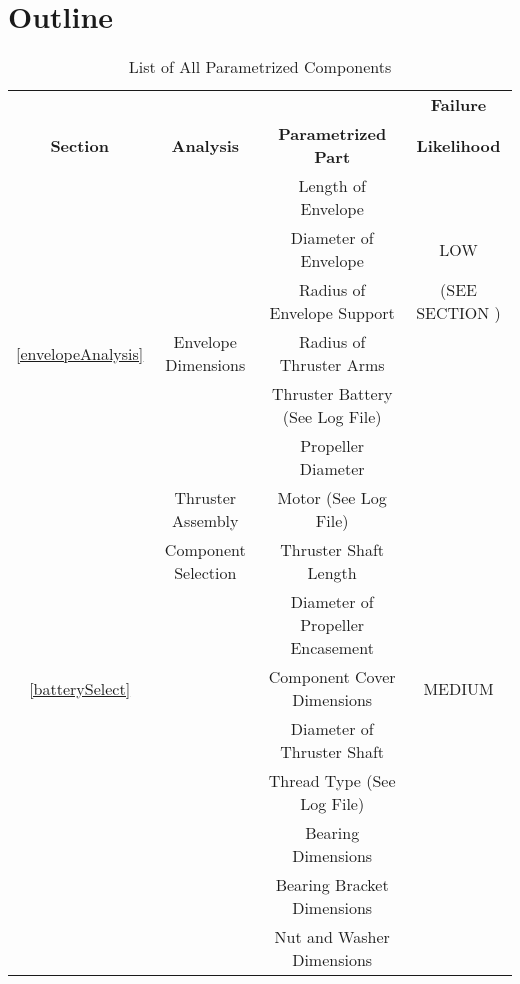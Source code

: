 \documentclass[../main.tex]{subfiles}
\begin{document}
\section{Outline}

\begin{table}[]
	\centering
	\caption{List of All Parametrized Components}
	\label{allComponents}
	\begin{tabular}{|c|c|c|c|}
		\hline
		&  &  & \textbf{Failure} \\
		\multirow{-2}{*}{\textbf{Section}} & \multirow{-2}{*}{\textbf{Analysis}} & \multirow{-2}{*}{\textbf{Parametrized Part}} & \textbf{Likelihood} \\ \hline
		&  & Length of Envelope &  \\ \cline{3-3}
		&  & Diameter of Envelope & LOW \\ \cline{3-3}
		&  & Radius of Envelope Support & (SEE SECTION ) \\ \cline{3-3}
		\multirow{-4}{*}{\ref{envelopeAnalysis}} & \multirow{-4}{*}{Envelope Dimensions} & Radius of Thruster Arms & \multicolumn{1}{l|}{} \\ \hline
		&  & Thruster Battery (See Log File) & \cellcolor[HTML]{C0C0C0} \\ \cline{3-3}
		&  & Propeller Diameter & \cellcolor[HTML]{C0C0C0} \\ \cline{3-3}
		& Thruster Assembly & Motor (See Log File) & \cellcolor[HTML]{C0C0C0} \\ \cline{3-3}
		& Component Selection & Thruster Shaft Length & \cellcolor[HTML]{C0C0C0} \\ \cline{3-3}
		&  & Diameter of Propeller Encasement & \cellcolor[HTML]{C0C0C0} \\ \cline{3-3}
		\multirow{-6}{*}{\ref{batterySelect}} & \multicolumn{1}{l|}{} & Component Cover Dimensions & \multirow{-6}{*}{\cellcolor[HTML]{C0C0C0}MEDIUM} \\ \hline
		&  & Diameter of Thruster Shaft & \cellcolor[HTML]{000000}{\color[HTML]{FFFFFF} } \\ \cline{3-3}
		&  & Thread Type (See Log File) & \cellcolor[HTML]{000000}{\color[HTML]{FFFFFF} } \\ \cline{3-3}
		&  & Bearing Dimensions & \cellcolor[HTML]{000000}{\color[HTML]{FFFFFF} } \\ \cline{3-3}
		&  & Bearing Bracket Dimensions & \cellcolor[HTML]{000000}{\color[HTML]{FFFFFF} } \\ \cline{3-3}
		&  & Nut and Washer Dimensions & \cellcolor[HTML]{000000}{\color[HTML]{FFFFFF} } \\ \cline{3-3}

\end{tabular}
\end{table}
\end{document}
